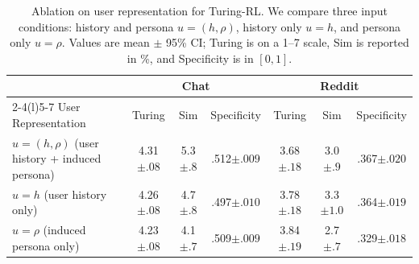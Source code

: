 \documentclass{article} %
\newcommand{\subtle}[1]{{\tiny\color[gray]{0.4}#1}}
\begin{document}
\begin{table}[t]
\centering
\small
\setlength{\tabcolsep}{2.0pt}
\begin{tabular*}{\columnwidth}{@{\extracolsep{\fill}}lcccccc@{}}
\toprule
\multirow{2}{*}{} & \multicolumn{3}{c}{Chat} & \multicolumn{3}{c}{Reddit} \\
\cmidrule(lr){2-4}\cmidrule(l){5-7}
User Representation & Turing & Sim & Specificity & Turing & Sim & Specificity \\
\midrule
$u = (h, \rho)$ (user history + induced persona) & 4.31\subtle{$\pm .08$} & 5.3\subtle{$\pm .8$} & .512\subtle{$\pm .009$} & {3.68}\subtle{$\pm .18$} & 3.0\subtle{$\pm .9$} & .367\subtle{$\pm .020$} \\
$u = h$ (user history only)      & 4.26\subtle{$\pm .08$} & 4.7\subtle{$\pm .8$} & {.497}\subtle{$\pm .010$} & 3.78\subtle{$\pm .18$} & 3.3\subtle{$\pm 1.0$} & .364\subtle{$\pm .019$} \\
 $u = \rho$ (induced persona only)    & {4.23}\subtle{$\pm .08$} & {4.1}\subtle{$\pm .7$} & .509\subtle{$\pm .009$} & 3.84\subtle{$\pm .19$} & {2.7}\subtle{$\pm .7$} & {.329}\subtle{$\pm .018$} \\
\bottomrule
\end{tabular*}
\vspace{-0.3cm}
\caption{Ablation on user representation for Turing-RL. We compare three input conditions: history and persona $u = (h, \rho)$, history only $u = h$, and persona only $u = \rho$.  Values are mean $\pm$ 95\% CI; Turing is on a 1--7 scale, Sim is reported in \%, and Specificity is in $[0,1]$.}
\label{tab:ablation_combined}
\vspace{-0.5cm}
\end{table}

\end{document}
